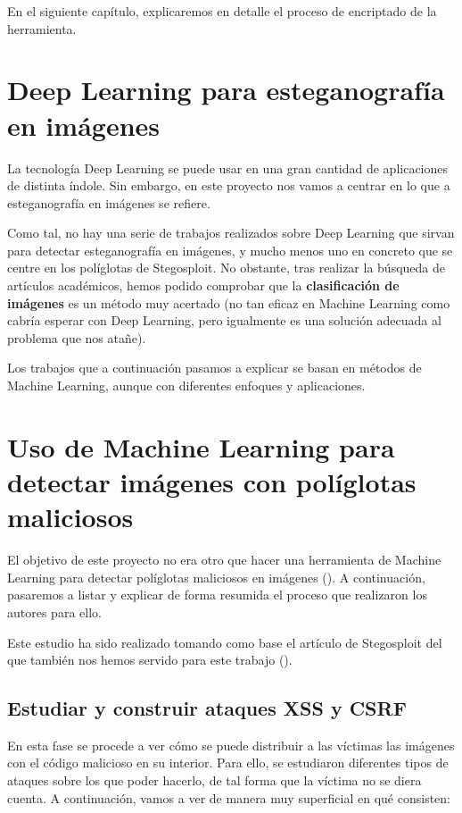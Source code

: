 En el siguiente capítulo, explicaremos en detalle el proceso de encriptado de la herramienta.

\section{Deep Learning para esteganografía en imágenes}

La tecnología Deep Learning se puede usar en una gran cantidad de aplicaciones de distinta índole. Sin embargo, en este proyecto nos vamos a centrar en lo que a esteganografía en imágenes se refiere.

Como tal, no hay una serie de trabajos realizados sobre Deep Learning que sirvan para detectar esteganografía en imágenes, y mucho menos uno en concreto que se centre en los políglotas de Stegosploit. No obstante, tras realizar la búsqueda de artículos académicos, hemos podido comprobar que la \textbf{clasificación de imágenes} es un método muy acertado (no tan eficaz en Machine Learning como cabría esperar con Deep Learning, pero igualmente es una solución adecuada al problema que nos atañe).

Los trabajos que a continuación pasamos a explicar se basan en métodos de Machine Learning, aunque con diferentes enfoques y aplicaciones. 

\section{Uso de Machine Learning para detectar imágenes con políglotas maliciosos}

El objetivo de este proyecto no era otro que hacer una herramienta de Machine Learning para detectar políglotas maliciosos en imágenes (\cite{ml-stenography-shawat}). A continuación, pasaremos a listar y explicar de forma resumida el proceso que realizaron los autores para ello. %

Este estudio ha sido realizado tomando como base el artículo de Stegosploit del que también nos hemos servido para este trabajo (\cite{stegosploit}). %

\subsection{Estudiar y construir ataques XSS y CSRF}

En esta fase se procede a ver cómo se puede distribuir a las víctimas las imágenes con el código malicioso en su interior. Para ello, se estudiaron diferentes tipos de ataques sobre los que poder hacerlo, de tal forma que la víctima no se diera cuenta. A continuación, vamos a ver de manera muy superficial en qué consisten:

